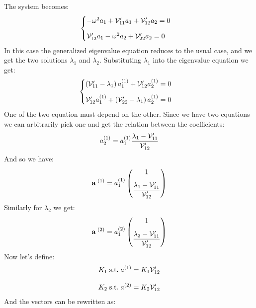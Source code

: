 The system becomes:
\begin{equation}
    \begin{cases}
        -\omega^2 a_1 + \mathcal{V}'_{11}a_1 + \mathcal{V}'_{12}a_2 = 0\\[8pt]
        \mathcal{V}'_{12}a_1 -\omega^2 a_2 + \mathcal{V}'_{22}a_2 = 0
    \end{cases}
\end{equation}
In this case the generalized eigenvalue equation reduces to the usual case, and we get the two solutions $\lambda_1$ and $\lambda_2$. Substituting $\lambda_1$ into the eigenvalue equation we get:
\begin{equation}
    \begin{cases}
        \left(\mathcal{V}'_{11}-\lambda_1\right)a_1^{(1)} + \mathcal{V}'_{12}a_2^{(1)} = 0\\[8pt]
        \mathcal{V}'_{12}a_1^{(1)} + \left(\mathcal{V}'_{22}-\lambda_1\right)a_2^{(1)} = 0
    \end{cases}
\end{equation}
One of the two equation must depend on the other. Since we have two equations we can arbitrarily pick one and get the relation between the coefficients:
\begin{equation}
    a_2^{(1)} = a_1^{(1)}\dfrac{\lambda_1 - \mathcal{V}'_{11}}{\mathcal{V}'_{12}}
\end{equation}
And so we have:
\begin{equation}
    \vb{a}^{\;(1)} = a_1^{(1)}\begin{pmatrix}
        1 \\[8pt] \dfrac{\lambda_1 - \mathcal{V}'_{11}}{\mathcal{V}'_{12}}
    \end{pmatrix}
\end{equation}
Similarly for $\lambda_2$ we get:
\begin{equation}
    \vb{a}^{\;(2)} = a_1^{(2)}\begin{pmatrix}
        1 \\[8pt] \dfrac{\lambda_2 - \mathcal{V}'_{11}}{\mathcal{V}'_{12}}
    \end{pmatrix}
\end{equation}
Now let's define:
\begin{equation}
    \begin{split}
        K_1\;\text{s.t.}\; a^{(1)} = K_1\mathcal{V}'_{12}\\[8pt]
        K_2\;\text{s.t.}\; a^{(2)} = K_2\mathcal{V}'_{12}
    \end{split}
\end{equation}
And the vectors can be rewritten as:

